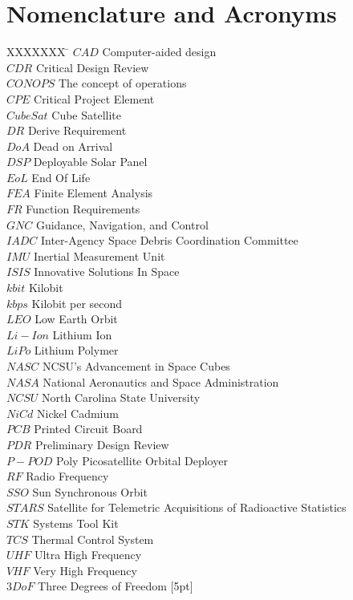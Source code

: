 \section*{Nomenclature and Acronyms}

\begin{tabbing}
  XXXXXXX \= \kill%
  $CAD$ \> Computer-aided design \\
  $CDR$ \> Critical Design Review \\
  $CONOPS$ \> The concept of operations \\
  $CPE$ \> Critical Project Element\\
  $CubeSat$ \> Cube Satellite \\
  $DR$ \> Derive Requirement \\
  $DoA$ \> Dead on Arrival \\
  $DSP$ \> Deployable Solar Panel \\
  $EoL$ \> End Of Life \\
  $FEA$ \> Finite Element Analysis \\
  $FR$ \> Function Requirements \\
  $GNC$ \> Guidance, Navigation, and Control \\
  $IADC$ \> Inter-Agency Space Debris Coordination Committee \\
  $IMU$ \> Inertial Measurement Unit \\
  $ISIS$ \> Innovative Solutions In Space \\
  $kbit$ \> Kilobit \\
  $kbps$ \> Kilobit per second \\
  $LEO$ \> Low Earth Orbit \\
  $Li-Ion$ \> Lithium Ion \\
  $LiPo$ \> Lithium Polymer \\
  $NASC$ \> NCSU's Advancement in Space Cubes \\
  $NASA$ \> National Aeronautics and Space Administration \\
  $NCSU$ \> North Carolina State University \\
  $NiCd$ \> Nickel Cadmium \\
  $PCB$ \> Printed Circuit Board \\
  $PDR$ \> Preliminary Design Review \\
  $P-POD$ \> Poly Picosatellite Orbital Deployer \\
  $RF$ \> Radio Frequency \\
  $SSO$ \> Sun Synchronous Orbit \\
  $STARS$ \> Satellite for Telemetric Acquisitions of Radioactive Statistics \\
  $STK$ \> Systems Tool Kit \\
  $TCS$ \> Thermal Control System \\
  $UHF$ \> Ultra High Frequency \\
  $VHF$ \> Very High Frequency \\
  $3DoF$ \> Three Degrees of Freedom
  [5pt]
 \end{tabbing}
 
 \vspace{0.5mm}
\pagebreak